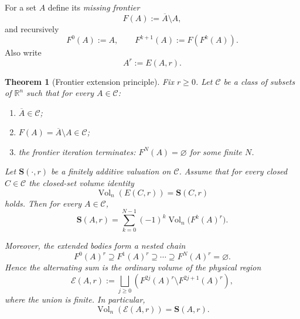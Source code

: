 \documentclass[11pt]{article}
\newtheorem{theorem}{Theorem}[section]
\newcommand{\R}{\mathbb R}
\newcommand{\Vol}{\operatorname{Vol}}
\newcommand{\Steiner}{\mathbf S}
\newcommand{\calE}{\mathcal E}
\numberwithin{equation}{section}
\begin{document}
For a set $A$ define its \emph{missing frontier}
\[
F(A):=\overline A\setminus A,
\]
and recursively
\[
F^0(A):=A,
\qquad
F^{k+1}(A):=F(F^k(A)).
\]
Also write
\[
A^r:=E(A,r).
\]

\begin{theorem}[Frontier extension principle]\label{thm:frontier-extension}
Fix $r\ge0$. Let $\mathcal C$ be a class of subsets of $\R^n$ such that for every $A\in\mathcal C$:
\begin{enumerate}
\item $\overline A\in\mathcal C$;
\item $F(A)=\overline A\setminus A\in\mathcal C$;
\item the frontier iteration terminates: $F^N(A)=\varnothing$ for some finite $N$.
\end{enumerate}
Let $\Steiner(\cdot,r)$ be a finitely additive valuation on $\mathcal C$. Assume that for every closed $C\in\mathcal C$ the closed-set volume identity
\begin{equation}\label{eq:abstract-closed-identity}
\boxed{
\Vol_n(E(C,r))=\Steiner(C,r)
}
\end{equation}
holds. Then for every $A\in\mathcal C$,
\begin{equation}\label{eq:frontier-alternating-sum}
\boxed{
\Steiner(A,r)
=
\sum_{k=0}^{N-1}(-1)^k
\Vol_n\bigl(F^k(A)^r\bigr).
}
\end{equation}

Moreover, the extended bodies form a nested chain
\[
F^0(A)^r\supseteq F^1(A)^r\supseteq\cdots\supseteq F^N(A)^r=\varnothing.
\]
Hence the alternating sum is the ordinary volume of the physical region
\begin{equation}\label{eq:physical-frontier-region}
\boxed{
\calE(A,r)
:=
\bigsqcup_{j\ge0}
\left(
F^{2j}(A)^r\setminus F^{2j+1}(A)^r
\right),
}
\end{equation}
where the union is finite. In particular,
\begin{equation}\label{eq:physical-frontier-volume}
\boxed{
\Vol_n(\calE(A,r))=\Steiner(A,r).
}
\end{equation}
\end{theorem}
\end{document}
